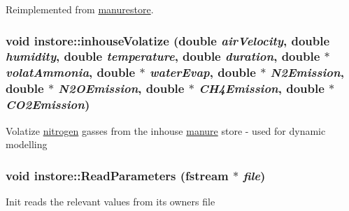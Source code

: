 Reimplemented from \hyperlink{classmanurestore_a0e71b577a0d53a31588784dd56c9b935}{manurestore}.\hypertarget{classinstore_a840256bcb3fe9248c741f2b0b22ff2e0}{
\subsubsection[{inhouseVolatize}]{\setlength{\rightskip}{0pt plus 5cm}void instore::inhouseVolatize (double {\em airVelocity}, \/  double {\em humidity}, \/  double {\em temperature}, \/  double {\em duration}, \/  double $\ast$ {\em volatAmmonia}, \/  double $\ast$ {\em waterEvap}, \/  double $\ast$ {\em N2Emission}, \/  double $\ast$ {\em N2OEmission}, \/  double $\ast$ {\em CH4Emission}, \/  double $\ast$ {\em CO2Emission})}}
\label{classinstore_a840256bcb3fe9248c741f2b0b22ff2e0}
Volatize \hyperlink{classnitrogen}{nitrogen} gasses from the inhouse \hyperlink{classmanure}{manure} store -\/ used for dynamic modelling \hypertarget{classinstore_a5f289ba185023e4b7c15d82e79d1ac7f}{
\subsubsection[{ReadParameters}]{\setlength{\rightskip}{0pt plus 5cm}void instore::ReadParameters (fstream $\ast$ {\em file})}}
\label{classinstore_a5f289ba185023e4b7c15d82e79d1ac7f}
Init reads the relevant values from its owners file 

